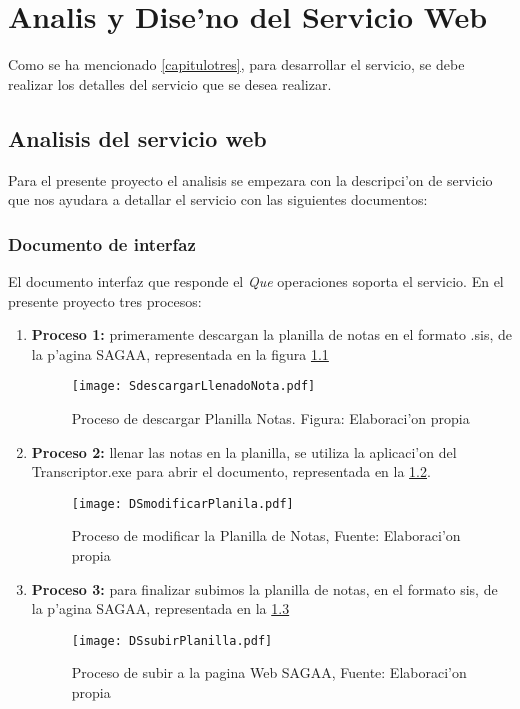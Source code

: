 \chapter{Analis y Dise'no del Servicio Web}
\label{capitulocuatro}

Como se ha mencionado \ref{capitulotres}, para desarrollar el servicio, se debe realizar los detalles del servicio que se desea realizar.
 \section{Analisis del servicio web}
 Para el presente proyecto el analisis se empezara con la descripci'on de servicio que nos ayudara a detallar el servicio con las siguientes documentos:
 \subsection{Documento de interfaz}
 El documento interfaz que responde el \textsl{Que} operaciones soporta el servicio. En el presente proyecto tres procesos:
 \begin{enumerate}
 \item  \textbf{Proceso 1:} primeramente descargan la planilla de notas en el formato .sis, de la p'agina SAGAA, representada en la figura \ref{fig:Proceso1}
 
 \begin{figure}[H]
 \centering
 \texttt{[image: SdescargarLlenadoNota.pdf]}
 \captionsetup{justification=centering,margin=2cm}
 \caption{Proceso de descargar Planilla Notas. Figura: Elaboraci'on propia}
 \label{fig:Proceso1}
 \end{figure}
 
 \item \textbf{Proceso 2:} llenar las notas en la planilla, se utiliza la aplicaci'on del Transcriptor.exe para abrir el documento, representada en la \ref{fig:Proceso2}.
 
 \begin{figure}[H]
 \centering
 \texttt{[image: DSmodificarPlanila.pdf]}
 \captionsetup{justification=centering,margin=2cm}
 \caption{Proceso de modificar la Planilla de Notas, Fuente: Elaboraci'on propia}
 \label{fig:Proceso2}
 \end{figure}
   
  \item \textbf{Proceso 3:} para finalizar subimos la planilla de notas, en el formato sis, de la p'agina SAGAA, representada en la \ref{fig:Proceso3}
  
\begin{figure}[H]
\centering
\texttt{[image: DSsubirPlanilla.pdf]}
\captionsetup{justification=centering, margin=2cm}
\caption{Proceso de subir a la pagina Web SAGAA, Fuente: Elaboraci'on propia}
 \label{fig:Proceso3}
 \end{figure}
 \end{enumerate}

